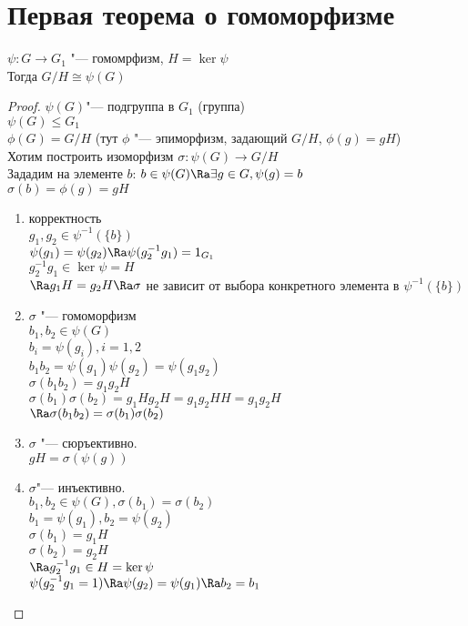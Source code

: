 ﻿\section{Первая теорема о гомоморфизме}
\begin{theorem}
$\psi \colon G \to G_1$ "--- гомомрфизм, $H = \ker \psi$\\
Тогда $G / H \cong \psi(G)$\\
\end{theorem}
\begin{proof}
$\psi(G)$"--- подгруппа в $G_1$ (группа)\\
$\psi(G) \le G_1$\\
$\phi(G) = G / H$ (тут $\phi$ "--- эпиморфизм, задающий $G/H$, $\phi(g) = gH$)\\
Хотим построить изоморфизм $\sigma\colon \psi(G) \to G / H$\\

Зададим на элементе $b$:
$b \in \psi(G) \Ra \exists g \in G, \psi(g) = b$\\
$\sigma(b) = \phi(g) = gH$\\
\begin{enumerate}
\item корректность\\
$g_1, g_2 \in \psi^{-1}(\{b\})$\\
$\psi(g_1) = \psi(g_2) \Ra \psi(g_2^{-1}g_1) = 1_{G_1}$\\
$g_2^{-1}g_1 \in \ker\psi = H$\\
$\Ra g_1H = g_2H \Ra \sigma$ не зависит от выбора конкретного элемента в $\psi^{-1}(\{b\})$\\
\item $\sigma$ "--- гомоморфизм\\
$b_1, b_2 \in \psi(G)$ \\
$b_i = \psi(g_i), i = 1,2$\\
$b_1b_2 = \psi(g_1)\psi(g_2) = \psi(g_1g_2)$\\
$\sigma(b_1b_2) = g_1g_2H$\\
$\sigma(b_1)\sigma(b_2) = g_1Hg_2H = g_1g_2HH = g_1g_2H$\\
$\Ra \sigma(b_1b_2) = \sigma(b_1)\sigma(b_2)$\\
\item $\sigma$ "--- сюръективно.\\
$gH = \sigma(\psi(g))$\\
\item $\sigma$"--- инъективно.\\
$b_1, b_2 \in \psi(G), \sigma(b_1) = \sigma(b_2)$\\
$b_1 = \psi(g_1), b_2 = \psi(g_2)$\\
$\sigma(b_1) = g_1H$\\
$\sigma(b_2) = g_2H$\\
$\Ra g_2^{-1}g_1 \in H = \ker \psi$\\
$\psi(g_2^{-1}g_1 = 1) \Ra \psi(g_2) = \psi(g_1) \Ra b_2 = b_1$\\
\end{enumerate}
\end{proof}
